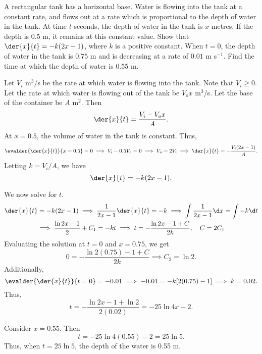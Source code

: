 \begin{problem}
    A rectangular tank has a horizontal base. Water is flowing into the tank at a constant rate, and flows out at a rate which is proportional to the depth of water in the tank. At time $t$ seconds, the depth of water in the tank is $x$ metres. If the depth is $0.5$ m, it remains at this constant value. Show that $\der{x}{t} = -k(2x-1)$, where $k$ is a positive constant. When $t = 0$, the depth of water in the tank is $0.75$ m and is decreasing at a rate of $0.01$ m s$^{-1}$. Find the time at which the depth of water is $0.55$ m.
\end{problem}
\begin{solution}
    Let $V_i$ m$^3$/s be the rate at which water is flowing into the tank. Note that $V_i \geq 0$. Let the rate at which water is flowing out of the tank be $V_o x$ m$^3$/s. Let the base of the container be $A$ m$^2$. Then \[\der{x}{t} = \frac{V_i - V_o x}{A}.\] At $x = 0.5$, the volume of water in the tank is constant. Thus, \[\evalder{\der{x}{t}}{x = 0.5} = 0 \implies V_i - 0.5 V_o = 0 \implies V_o = 2V_i \implies \der{x}{t} = -\frac{V_i (2x - 1)}{A}.\] Letting $k = V_i/A$, we have \[\der{x}{t} = -k(2x - 1).\]

    We now solve for $t$.
    \begin{gather*}
        \der{x}{t} = -k(2x - 1) \implies \frac{1}{2x-1} \der{x}{t} = -k \implies \int \frac{1}{2x-1} \d x = \int -k \d t \\
        \implies \frac{\ln{2x-1}}2 + C_1 = -kt \implies t = -\frac{\ln{2x-1} + C}{2k}, \quad C = 2C_1
    \end{gather*}
    Evaluating the solution at $t = 0$ and $x = 0.75$, we get \[0 = -\frac{\ln{2(0.75) - 1} + C}{2k} \implies C_2 = \ln 2.\] Additionally, \[\evalder{\der{x}{t}}{t = 0} = -0.01 \implies -0.01 = -k[2(0.75) -1] \implies k = 0.02.\] Thus, \[t = -\frac{\ln{2x-1} + \ln 2}{2(0.02)} = -25 \ln{4x-2}.\] 
    
    Consider $x = 0.55$. Then \[t = -25\ln{4(0.55) - 2} = 25\ln5.\] Thus, when $t = 25 \ln 5$, the depth of the water is 0.55 m.
\end{solution}

